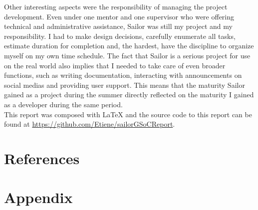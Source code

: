 \documentclass{article}
\begin{document}
Other interesting aspects were the responsibility of managing the project development. Even under one mentor and one supervisor who were offering technical and administrative assistance, Sailor was still my project and my responsibility. I had to make design decisions, carefully enumerate all tasks, estimate duration for completion and, the hardest, have the discipline to organize myself on my own time schedule. The fact that Sailor is a serious project for use on the real world also implies that I needed to take care of even broader functions, such as writing documentation, interacting with announcements on social medias and providing user support. This means that the maturity Sailor gained as a project during the summer directly reflected on the maturity I gained as a developer during the same period.\\

This report was composed with LaTeX and the source code to this report can be found at \url{https://github.com/Etiene/sailorGSoCReport}.



\clearpage
\newpage

\section{References}
	\printbibliography[title={Books},type=book,heading=subbibnumbered]
	\printbibliography[title={Articles},type=article,heading=subbibnumbered]
	\printbibliography[title={Websites},type=misc,heading=subbibnumbered]

	\newpage
	\section{Appendix}
	\begin{appendix}
	 \listoffigures
  \listoftables
	\end{appendix}
\end{document}

